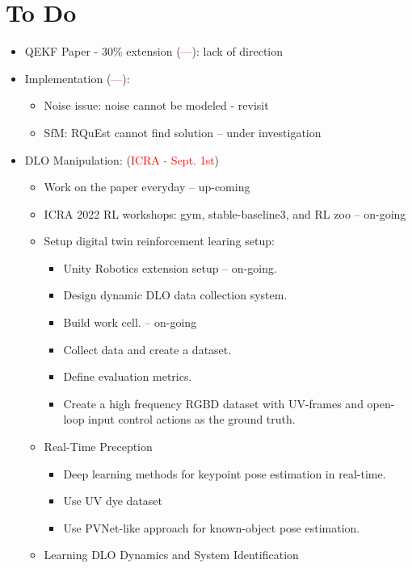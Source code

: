 \documentclass[11pt]{article}
\begin{document}
\section{To Do}
\begin{itemize}
  \item QEKF Paper - 30\% extension (\textcolor{red}{---}): lack of direction
  \item Implementation (\textcolor{red}{---}):
  \begin{itemize}
      \item Noise issue: noise cannot be modeled - revisit
      \item SfM: RQuEst cannot find solution -- under investigation
  \end{itemize}
  \item  DLO Manipulation: (\textcolor{red}{ICRA - Sept. 1st})
  \begin{itemize}
      \item Work on the paper everyday -- up-coming
      \item ICRA 2022 RL workshops: gym, stable-baseline3, and RL zoo -- on-going
      \item Setup digital twin reinforcement learing setup:
      \begin{itemize}
        \item Unity Robotics extension setup -- on-going.
        \item Design dynamic DLO data collection system.
        \item Build work cell. -- on-going
        \item Collect data and create a dataset.
        \item Define evaluation metrics.
        \item Create a high frequency RGBD dataset with UV-frames and open-loop input control actions as the ground truth.
      \end{itemize}
      \item Real-Time Preception
      \begin{itemize}
        \item Deep learning methods for keypoint pose estimation in real-time.
        \item Use UV dye dataset
        \item Use PVNet-like approach for known-object pose estimation.
      \end{itemize}
      \item Learning DLO Dynamics and System Identification
      \begin{itemize}

\end{itemize}
\end{itemize}
\end{itemize}
\end{document}
